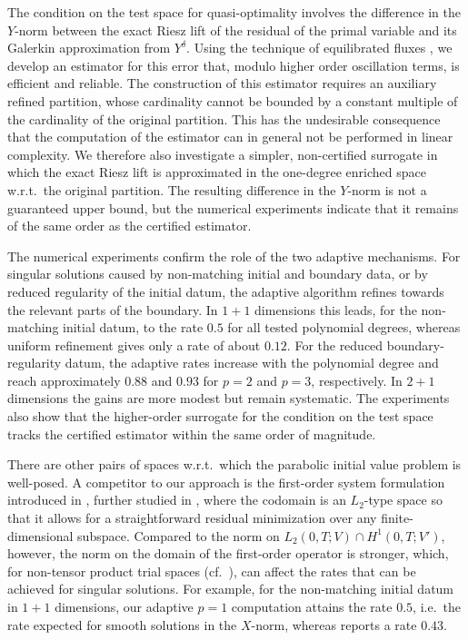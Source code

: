 \documentclass{amsart}
\numberwithin{equation}{section}
\newcommand{\1}{\mathbb 1}
\begin{document}
The condition on the test space for quasi-optimality involves the difference in the $Y$-norm between the exact Riesz lift of the residual of the primal variable and its Galerkin approximation from $Y^\delta$. Using the technique of equilibrated fluxes \cite{70.8}, we develop an estimator for this error that, modulo higher order oscillation terms, is efficient and reliable.
The construction of this estimator requires an auxiliary refined partition, whose cardinality cannot be bounded by a constant multiple of the cardinality of the original partition. This has the undesirable consequence that the computation of the estimator can in general not be performed in linear complexity. We therefore also investigate a simpler, non-certified surrogate in which the exact Riesz lift is approximated in the one-degree enriched space w.r.t.~the original partition. The resulting difference in the $Y$-norm is not a guaranteed upper bound, but the numerical experiments indicate that it remains of the same order as the certified estimator.

The numerical experiments confirm the role of the two adaptive mechanisms. For singular solutions caused by non-matching initial and boundary data, or by reduced regularity of the initial datum, the adaptive algorithm refines towards the relevant parts of the boundary. In $1+1$ dimensions this leads, for the non-matching initial datum, to the rate $0.5$ for all tested polynomial degrees, whereas uniform refinement gives only a rate of about $0.12$. For the reduced boundary-regularity datum, the adaptive rates increase with the polynomial degree and reach approximately $0.88$ and $0.93$ for $p=2$ and $p=3$, respectively. In $2+1$ dimensions the gains are more modest but remain systematic. The experiments also show that the higher-order surrogate for the condition on the test space tracks the certified estimator within the same order of magnitude.

There are other pairs of spaces w.r.t.~which the parabolic initial value problem is well-posed.
A competitor to our approach is the first-order system formulation 
introduced in \cite{75.257}, further studied in \cite{75.28,75.291}, where the codomain is an $L_2$-type space so that it allows for a straightforward residual minimization over any finite-dimensional subspace. Compared to the norm on $L_2(0,T;V) \cap H^{1}(0,T;V')$, however, the norm on the domain of the first-order operator is stronger, which, for non-tensor product trial spaces (cf.~\cite{75.291,75.2592}), can affect the rates that can be achieved for singular solutions. For example, for the non-matching initial datum in $1+1$ dimensions, our adaptive $p=1$ computation attains the rate $0.5$, i.e.~the rate expected for smooth solutions in the $X$-norm, whereas \cite{75.291} reports a rate $0.43$.
\end{document}
